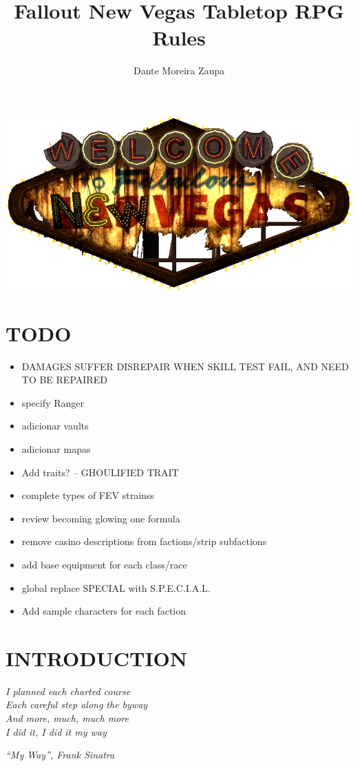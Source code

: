 \documentclass[11pt]{article} %
\title{Fallout New Vegas Tabletop RPG Rules}
\author{Dante Moreira Zaupa}
\begin{document}
\maketitle
\begin{center}
\includegraphics[scale=0.5]{logo_new_vegas.png}
\end{center}
\newpage
\tableofcontents
\newpage

\section{TODO}
\begin{itemize}
\item DAMAGES SUFFER DISREPAIR WHEN SKILL TEST FAIL, AND NEED TO BE REPAIRED
\item specify Ranger
\item adicionar vaults
\item adicionar mapas
\item Add traits? -- GHOULIFIED TRAIT
\item complete types of FEV strainss
\item review becoming glowing one formula
\item remove casino descriptions from factions/strip subfactions
\item add base equipment for each class/race
\item global replace SPECIAL with S.P.E.C.I.A.L. 
\item Add sample characters for each faction
\end{itemize}
\newpage

\section{INTRODUCTION}

\epigraph{\textit{I planned each charted course \\
Each careful step along the byway \\
And more, much, much more \\
I did it, I did it my way}}{\textit{``My Way'', Frank Sinatra}}
\end{document}
